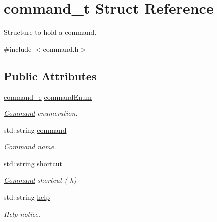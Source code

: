 \hypertarget{structcommand__t}{}\section{command\+\_\+t Struct Reference}
\label{structcommand__t}


Structure to hold a command.  




{\ttfamily \#include $<$command.\+h$>$}

\subsection*{Public Attributes}
\begin{DoxyCompactItemize}
\item 
\hypertarget{structcommand__t_a482126330d56b967d7428d61cc5b7d6b}{}\hyperlink{command_8h_aafce48252f7b3163fa15e458dd84ba12}{command\+\_\+e} \hyperlink{structcommand__t_a482126330d56b967d7428d61cc5b7d6b}{command\+Enum}\label{structcommand__t_a482126330d56b967d7428d61cc5b7d6b}

\begin{DoxyCompactList}\small\item\em \hyperlink{class_command}{Command} enumeration. \end{DoxyCompactList}\item 
\hypertarget{structcommand__t_ac126c83fffc4006f8573bb0913f0e210}{}std\+::string \hyperlink{structcommand__t_ac126c83fffc4006f8573bb0913f0e210}{command}\label{structcommand__t_ac126c83fffc4006f8573bb0913f0e210}

\begin{DoxyCompactList}\small\item\em \hyperlink{class_command}{Command} name. \end{DoxyCompactList}\item 
\hypertarget{structcommand__t_a2c5eb968130a5e8dcd441fa423008fbe}{}std\+::string \hyperlink{structcommand__t_a2c5eb968130a5e8dcd441fa423008fbe}{shortcut}\label{structcommand__t_a2c5eb968130a5e8dcd441fa423008fbe}

\begin{DoxyCompactList}\small\item\em \hyperlink{class_command}{Command} shortcut (-\/h) \end{DoxyCompactList}\item 
\hypertarget{structcommand__t_aea1619c73e305ebac8751c5aefdf7e6b}{}std\+::string \hyperlink{structcommand__t_aea1619c73e305ebac8751c5aefdf7e6b}{help}\label{structcommand__t_aea1619c73e305ebac8751c5aefdf7e6b}

\begin{DoxyCompactList}\small\item\em Help notice. \end{DoxyCompactList}\end{DoxyCompactItemize}


